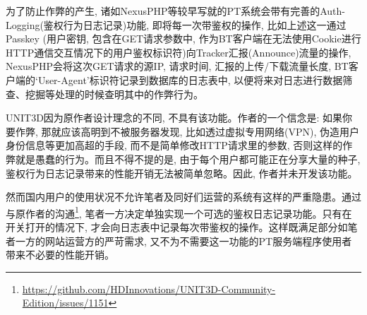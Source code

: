 为了防止作弊的产生, 诸如NexusPHP等较早写就的PT系统会带有完善的Auth-Logging(鉴权行为日志记录)功能, 即将每一次带鉴权的操作, 比如上述这一通过Passkey (用户密钥, 包含在GET请求参数中, 作为BT客户端在无法使用Cookie进行HTTP通信交互情况下的用户鉴权标识符)向Tracker汇报(Announce)流量的操作, NexusPHP会将这次GET请求的源IP, 请求时间, 汇报的上传/下载流量长度, BT客户端的`User-Agent'标识符记录到数据库的日志表中, 以便将来对日志进行数据筛查、挖掘等处理的时候查明其中的作弊行为。

UNIT3D因为原作者设计理念的不同, 不具有该功能。作者的一个信念是: 如果你要作弊, 那就应该高明到不被服务器发现, 比如透过虚拟专用网络(VPN), 伪造用户身份信息等更加高超的手段, 而不是简单修改HTTP请求里的参数, 否则这样的作弊就是愚蠢的行为。而且不得不提的是, 由于每个用户都可能正在分享大量的种子, 鉴权行为日志记录带来的性能开销无法被简单忽略。因此, 作者并未开发该功能。

然而国内用户的使用状况不允许笔者及同好们运营的系统有这样的严重隐患。通过与原作者的沟通\footnote{\url{https://github.com/HDInnovations/UNIT3D-Community-Edition/issues/1151}}, 笔者一方决定单独实现一个可选的鉴权日志记录功能。只有在开关打开的情况下, 才会向日志表中记录每次带鉴权的操作。这样既满足部分如笔者一方的网站运营方的严苛需求, 又不为不需要这一功能的PT服务端程序使用者带来不必要的性能开销。





